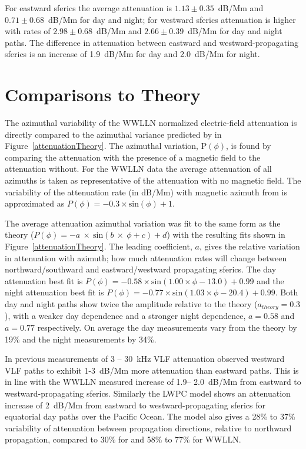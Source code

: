 \documentclass[draft,jgrga]{AGUTeX}
\begin{document}
\begin{article}
For eastward sferics the average attenuation is $1.13\pm0.35$~dB/Mm and $0.71\pm0.68$~dB/Mm for day and night; for westward sferics attenuation is higher with rates of $2.98\pm0.68$~dB/Mm and $2.66\pm0.39$~dB/Mm for day and night paths.
The difference in attenuation between eastward and westward-propagating sferics is an increase of  1.9~dB/Mm for day and 2.0~dB/Mm for night.
  
\section{Comparisons to Theory}

The azimuthal variability of the WWLLN normalized electric-field attenuation is directly compared to the azimuthal variance predicted by \citet{Wait1960a} in Figure~\ref{attenuationTheory}.
The azimuthal variation, P$(\phi)$, is found by comparing the attenuation with the presence of a magnetic field to the attenuation without.
For the WWLLN data the average attenuation of all azimuths is taken as representative of the attenuation with no magnetic field.
The variability of the attenuation rate (in dB/Mm) with magnetic azimuth from \citet{Wait1960a} is approximated as $P(\phi) = - 0.3 \times \text{sin}(\phi) + 1$.

The average attenuation azimuthal variation was fit to the same form as the theory ($P(\phi) = - a~\times~\text{sin}(b~\times~\phi + c) + d$) with the resulting fits shown in Figure~\ref{attenuationTheory}.
The leading coefficient, $a$, gives the relative variation in attenuation with azimuth; how much attenuation rates will change between northward/southward and eastward/westward propagating sferics.
The day attenuation best fit is $P(\phi) = - 0.58 \times \text{sin}(1.00\times\phi - 13.0) + 0.99$ and the night attenuation best fit is $P(\phi) = - 0.77 \times \text{sin}(1.03\times\phi - 20.4) + 0.99$.
Both day and night paths show twice the amplitude relative to the theory ($a_{theory} = 0.3$), with a weaker day dependence and a stronger night dependence, $a=0.58$ and $a=0.77$ respectively.
On average the day measurements vary from the theory by 19\% and the night measurements by 34\%.

In previous measurements of 3 -- 30~kHz VLF attenuation \citet{Taylor1960a} observed westward VLF paths to exhibit 1-3~dB/Mm more attenuation than eastward paths.
This is in line with the WWLLN measured increase of 1.9-- 2.0~dB/Mm from eastward to westward-propagating sferics.
Similarly the LWPC model shows an attenuation increase of 2~dB/Mm from eastward to westward-propagating sferics for equatorial day paths over the Pacific Ocean.
The model also gives a 28\% to 37\% variability of attenuation between propagation directions, relative to northward propagation, compared to 30\% for \citet{Wait1960a} and 58\% to 77\% for WWLLN.


\end{article}
\end{document}
